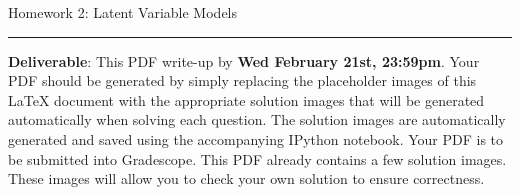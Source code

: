 \documentclass{article}
\newcommand{\ruleskip}{\bigskip\hrule\bigskip}
\begin{document}
\pagestyle{myheadings} 

{\huge
\noindent Homework 2: Latent Variable Models}
\ruleskip

{\bf Deliverable}: This PDF write-up by {\bf Wed February 21st, 23:59pm}.  Your PDF should be generated by simply replacing the placeholder images of this LaTeX document with the appropriate solution images that will be generated automatically when solving each question. The solution images are automatically generated and saved using the accompanying IPython notebook. Your PDF is to be submitted into Gradescope. This PDF already contains a few solution images.  These images will allow you to check your own solution to ensure correctness.


\vspace{.2in}

\end{document}
